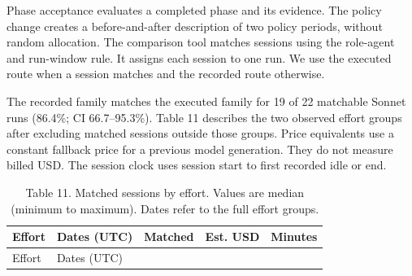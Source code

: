 \documentclass[
  10pt,
  a4paper,
]{article}
\begin{document}
Phase acceptance evaluates a completed phase and its evidence. The
policy change creates a before-and-after description of two policy
periods, without random allocation. The comparison tool matches sessions
using the role-agent and run-window rule. It assigns each session to one
run. We use the executed route when a session matches and the recorded
route otherwise.

The recorded family matches the executed family for 19 of 22 matchable
Sonnet runs (86.4\%; CI 66.7--95.3\%). Table 11 describes the two
observed effort groups after excluding matched sessions outside those
groups. Price equivalents use a constant fallback price for a previous
model generation. They do not measure billed USD. The session clock uses
session start to first recorded idle or end.

\begin{longtable}[]{@{}
  >{\raggedright\arraybackslash}p{}
  >{\raggedright\arraybackslash}p{}
  >{\raggedleft\arraybackslash}p{}
  >{\raggedleft\arraybackslash}p{}
  >{\raggedleft\arraybackslash}p{}@{}}
\caption{Table 11. Matched sessions by effort. Values are median
(minimum to maximum). Dates refer to the full effort
groups.}\tabularnewline
\toprule\noalign{}
\begin{minipage}[b]{\linewidth}\raggedright
Effort
\end{minipage} & \begin{minipage}[b]{\linewidth}\raggedright
Dates (UTC)
\end{minipage} & \begin{minipage}[b]{\linewidth}\raggedleft
Matched
\end{minipage} & \begin{minipage}[b]{\linewidth}\raggedleft
Est. USD
\end{minipage} & \begin{minipage}[b]{\linewidth}\raggedleft
Minutes
\end{minipage} \\
\midrule\noalign{}
\endfirsthead
\toprule\noalign{}
\begin{minipage}[b]{\linewidth}\raggedright
Effort
\end{minipage} & \begin{minipage}[b]{\linewidth}\raggedright
Dates (UTC)
\end{minipage} & \begin{minipage}[b]{\linewidth}\raggedleft

\end{minipage}
\end{longtable}
\end{document}
